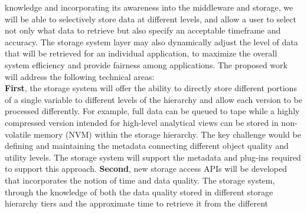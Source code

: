 \documentclass[11pt,letterpaper]{article}
\newcommand{\hasan}[1]{{\it \color{darkgreen} #1 -Hasan }}
\newcommand{\hasan}[1]{}
\begin{document}
knowledge and incorporating its awareness into the middleware and storage,
we will be able to selectively store data at different levels, and allow a user to select 
not only what data to retrieve but also specify an acceptable timeframe and accuracy.
The storage system layer may also dynamically 
adjust the level of data that will be retrieved
for an individual application,  to maximize the overall system efficiency and 
provide fairness among applications.
%
%
The proposed work will address the following technical areas:
\\\textbf{First}, the storage system will offer the ability to directly store
different portions of a single variable to different
levels of the hierarchy and allow each version to be processed 
differently. For example, full data can be queued to tape while
a highly compressed version intended for high-level analytical views can be
stored in non-volatile memory (NVM)  within the storage
hierarchy. 
The key challenge would be defining and maintaining the metadata
connecting different object quality and utility levels. 
The storage system will support the metadata and plug-ins required to support
this approach.   
%
\textbf{Second}, new storage access APIs will be developed that incorporates the
notion of time and data quality. The storage system,
through the knowledge of both the data quality stored in different storage
hierarchy tiers and the approximate time to retrieve it from the different
\end{document}
